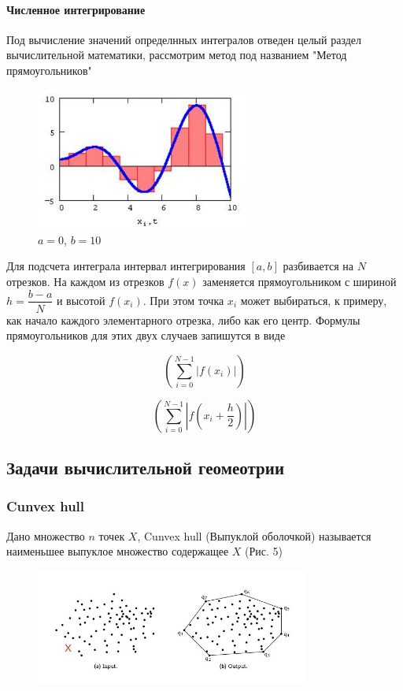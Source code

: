 \paragraph*{Численное интегрирование} Под вычисление значений определнных интегралов отведен целый раздел вычислительной математики, рассмотрим метод под названием "Метод прямоугольников"

\begin{figure}[H]
    \centering
    \includegraphics[width = 7cm]{Integral_numerical.jpeg}
    \caption{$a = 0$, $b = 10$}
    \label{fig:float}
\end{figure}
Для подсчета интеграла интервал интегрирования $[a,b]$ разбивается на $N$ отрезков. На каждом из отрезков $f(x)$ заменяется прямоугольником с шириной $h = \dfrac{b - a}{N}$ и высотой $f(x_i)$. При этом точка $x_i$ может выбираться, к примеру, как начало каждого элементарного отрезка, либо как его центр. Формулы прямоугольников для этих двух случаев запишутся в виде

\[
    \left( \sum_{i=0}^{N - 1} \left| f(x_i) \right| \right)
\]

\[
    \left( \sum_{i=0}^{N - 1} \left| f(x_i + \dfrac{h}{2}) \right| \right)
\]

\subsection{Задачи вычислительной геомеотрии}
\subsubsection{Cunvex hull}
Дано множество $n$ точек $X$, Cunvex hull (Выпуклой оболочкой) называется наименьшее выпуклое множество содержащее $X$ (Рис. 5)

\begin{figure}[H]
    \centering
    \includegraphics[width = 9cm]{Convex_hull.jpeg}
    \caption{}
    \label{fig:float}
\end{figure}

